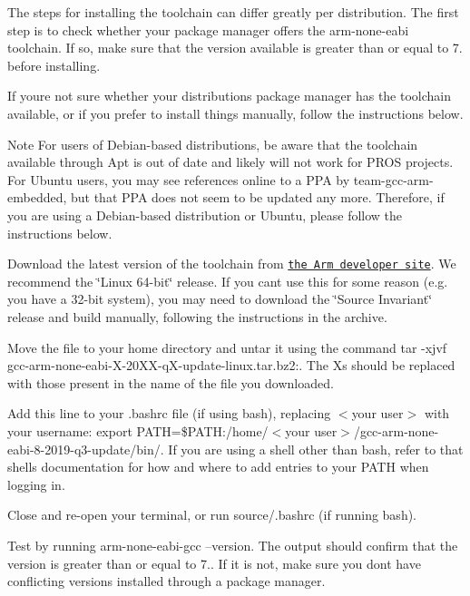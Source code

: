 The steps for installing the toolchain can differ greatly per distribution. The first step is to check whether your package manager offers the arm-\/none-\/eabi toolchain. If so, make sure that the version available is greater than or equal to 7. before installing.

If you\textquotesingle{}re not sure whether your distribution\textquotesingle{}s package manager has the toolchain available, or if you prefer to install things manually, follow the instructions below.

\begin{DoxyNote}{Note}
For users of Debian-\/based distributions, be aware that the toolchain available through Apt is out of date and likely will not work for P\+R\+OS projects. For Ubuntu users, you may see references online to a P\+PA by team-\/gcc-\/arm-\/embedded, but that P\+PA does not seem to be updated any more. Therefore, if you are using a Debian-\/based distribution or Ubuntu, please follow the instructions below.
\end{DoxyNote}

\begin{DoxyEnumerate}
\item Download the latest version of the toolchain from \href{https://developer.arm.com/tools-and-software/open-source-software/developer-tools/gnu-toolchain/gnu-rm/downloads}{\tt the Arm developer site}. We recommend the \char`\"{}\+Linux 64-\/bit\char`\"{} release. If you can\textquotesingle{}t use this for some reason (e.\+g. you have a 32-\/bit system), you may need to download the \char`\"{}\+Source Invariant\char`\"{} release and build manually, following the instructions in the archive.
\item Move the file to your home directory and untar it using the command tar -\/xjvf gcc-\/arm-\/none-\/eabi-\/\+X-\/20\+X\+X-\/q\+X-\/update-\/linux.\+tar.\+bz2\+:. The Xs should be replaced with those present in the name of the file you downloaded.
\item Add this line to your .bashrc file (if using bash), replacing $<$your user$>$ with your username\+: export P\+A\+TH=\$P\+A\+TH\+:/home/$<$your user$>$/gcc-\/arm-\/none-\/eabi-\/8-\/2019-\/q3-\/update/bin/. If you are using a shell other than bash, refer to that shell\textquotesingle{}s documentation for how and where to add entries to your P\+A\+TH when logging in.
\item Close and re-\/open your terminal, or run source/.bashrc (if running bash).
\item Test by running arm-\/none-\/eabi-\/gcc --version. The output should confirm that the version is greater than or equal to 7.. If it is not, make sure you don\textquotesingle{}t have conflicting versions installed through a package manager.
\end{DoxyEnumerate}

